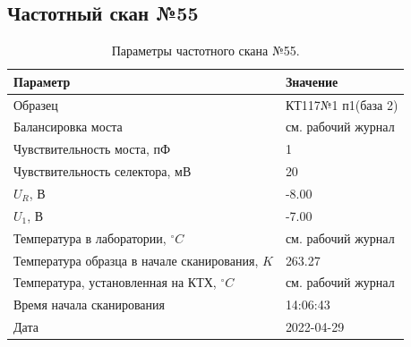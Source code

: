 \subsection{Частотный скан №55}
\begin{table}[!ht]
    \centering
    \caption{Параметры частотного скана №55.}
    \begin{tabular}{|l|l|}
        \hline
        Параметр                                       & Значение                  \\ \hline
        Образец                                        & КТ117№1 п1(база 2)        \\ \hline
        Балансировка моста                             & см. рабочий журнал        \\ \hline
        Чувствительность моста, пФ                     & 1                         \\ \hline
        Чувствительность селектора, мВ                 & 20                        \\ \hline
        $U_R$, В                                       & -8.00                     \\ \hline
        $U_1$, В                                       & -7.00                     \\ \hline
        Температура в лаборатории, $^\circ C$          & см. рабочий журнал        \\ \hline
        Температура образца в начале сканирования, $K$ & 263.27                    \\ \hline
        Температура, установленная на КТХ, $^\circ C$  & см. рабочий журнал        \\ \hline
        Время начала сканирования                      & 14:06:43                  \\ \hline
        Дата                                           & 2022-04-29                \\ \hline
    \end{tabular}
    \label{table:frequency_scan_55}
\end{table}

